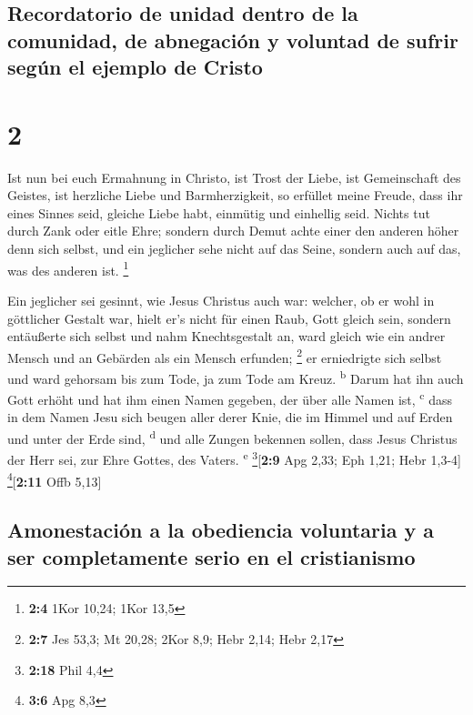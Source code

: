 \hypertarget{recordatorio-de-unidad-dentro-de-la-comunidad-de-abnegaciuxf3n-y-voluntad-de-sufrir-seguxfan-el-ejemplo-de-cristo}{%
\subsection{Recordatorio de unidad dentro de la comunidad, de abnegación
y voluntad de sufrir según el ejemplo de
Cristo}\label{recordatorio-de-unidad-dentro-de-la-comunidad-de-abnegaciuxf3n-y-voluntad-de-sufrir-seguxfan-el-ejemplo-de-cristo}}

\hypertarget{section-1}{%
\section{2}\label{section-1}}

 Ist nun bei euch Ermahnung in Christo, ist Trost der
Liebe, ist Gemeinschaft des Geistes, ist herzliche Liebe und
Barmherzigkeit,  so erfüllet meine Freude, dass ihr eines
Sinnes seid, gleiche Liebe habt, einmütig und einhellig seid.
 Nichts tut durch Zank oder eitle Ehre; sondern durch
Demut achte einer den anderen höher denn sich selbst,  und
ein jeglicher sehe nicht auf das Seine, sondern auch auf das, was des
anderen ist. \footnote{\textbf{2:4} 1Kor 10,24; 1Kor 13,5}

 Ein jeglicher sei gesinnt, wie Jesus Christus auch war:
 welcher, ob er wohl in göttlicher Gestalt war, hielt er's
nicht für einen Raub, Gott gleich sein,  sondern
entäußerte sich selbst und nahm Knechtsgestalt an, ward gleich wie ein
andrer Mensch und an Gebärden als ein Mensch erfunden; \footnote{\textbf{2:7}
  Jes 53,3; Mt 20,28; 2Kor 8,9; Hebr 2,14; Hebr 2,17}  er
erniedrigte sich selbst und ward gehorsam bis zum Tode, ja zum Tode am
Kreuz. \textsuperscript{b}  Darum hat ihn auch Gott erhöht
und hat ihm einen Namen gegeben, der über alle Namen ist,
\textsuperscript{c}  dass in dem Namen Jesu sich beugen
aller derer Knie, die im Himmel und auf Erden und unter der Erde sind,
\textsuperscript{d}  und alle Zungen bekennen sollen,
dass Jesus Christus der Herr sei, zur Ehre Gottes, des Vaters.
\textsuperscript{e} \footnote{\textbf{2:18} Phil 4,4}{[}\textbf{2:9} Apg
2,33; Eph 1,21; Hebr 1,3-4{]} \footnote{\textbf{3:6} Apg 8,3}{[}\textbf{2:11}
Offb 5,13{]}

\hypertarget{amonestaciuxf3n-a-la-obediencia-voluntaria-y-a-ser-completamente-serio-en-el-cristianismo}{%
\subsection{Amonestación a la obediencia voluntaria y a ser
completamente serio en el
cristianismo}\label{amonestaciuxf3n-a-la-obediencia-voluntaria-y-a-ser-completamente-serio-en-el-cristianismo}}

